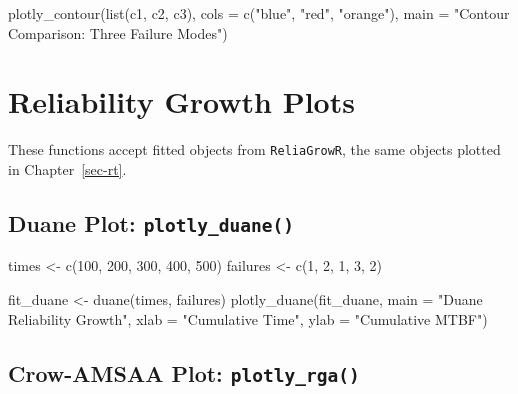 \documentclass[
  letterpaper,
  DIV=11,
  numbers=noendperiod]{scrreprt}
\newenvironment{Shaded}{\begin{snugshade}}{\end{snugshade}}
\newcommand{\AttributeTok}[1]{\textcolor[rgb]{0.40,0.45,0.13}{#1}}
\newcommand{\DecValTok}[1]{\textcolor[rgb]{0.68,0.00,0.00}{#1}}
\newcommand{\FunctionTok}[1]{\textcolor[rgb]{0.28,0.35,0.67}{#1}}
\newcommand{\NormalTok}[1]{\textcolor[rgb]{0.00,0.23,0.31}{#1}}
\newcommand{\OtherTok}[1]{\textcolor[rgb]{0.00,0.23,0.31}{#1}}
\newcommand{\StringTok}[1]{\textcolor[rgb]{0.13,0.47,0.30}{#1}}
\begin{document}
\begin{Shaded}
\begin{Highlighting}[]
\FunctionTok{plotly\_contour}\NormalTok{(}\FunctionTok{list}\NormalTok{(c1, c2, c3),}
               \AttributeTok{cols =} \FunctionTok{c}\NormalTok{(}\StringTok{"blue"}\NormalTok{, }\StringTok{"red"}\NormalTok{, }\StringTok{"orange"}\NormalTok{),}
               \AttributeTok{main =} \StringTok{"Contour Comparison: Three Failure Modes"}\NormalTok{)}
\end{Highlighting}
\end{Shaded}

\section{Reliability Growth Plots}\label{reliability-growth-plots}

These functions accept fitted objects from \texttt{ReliaGrowR}, the same
objects plotted in Chapter~\ref{sec-rt}.

\subsection{\texorpdfstring{Duane Plot:
\texttt{plotly\_duane()}}{Duane Plot: plotly\_duane()}}\label{duane-plot-plotly_duane}

\begin{Shaded}
\begin{Highlighting}[]
\NormalTok{times    }\OtherTok{\textless{}{-}} \FunctionTok{c}\NormalTok{(}\DecValTok{100}\NormalTok{, }\DecValTok{200}\NormalTok{, }\DecValTok{300}\NormalTok{, }\DecValTok{400}\NormalTok{, }\DecValTok{500}\NormalTok{)}
\NormalTok{failures }\OtherTok{\textless{}{-}} \FunctionTok{c}\NormalTok{(}\DecValTok{1}\NormalTok{, }\DecValTok{2}\NormalTok{, }\DecValTok{1}\NormalTok{, }\DecValTok{3}\NormalTok{, }\DecValTok{2}\NormalTok{)}

\NormalTok{fit\_duane }\OtherTok{\textless{}{-}} \FunctionTok{duane}\NormalTok{(times, failures)}
\FunctionTok{plotly\_duane}\NormalTok{(fit\_duane,}
             \AttributeTok{main =} \StringTok{"Duane Reliability Growth"}\NormalTok{,}
             \AttributeTok{xlab =} \StringTok{"Cumulative Time"}\NormalTok{,}
             \AttributeTok{ylab =} \StringTok{"Cumulative MTBF"}\NormalTok{)}
\end{Highlighting}
\end{Shaded}

\subsection{\texorpdfstring{Crow-AMSAA Plot:
\texttt{plotly\_rga()}}{Crow-AMSAA Plot: plotly\_rga()}}\label{crow-amsaa-plot-plotly_rga}
\end{document}

